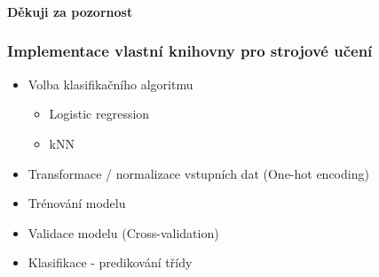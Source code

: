 \documentclass{beamer}
\begin{document}
\begin{frame}
    \frametitle{}
    \centering \textbf{Děkuji za pozornost}
\end{frame}


\begin{frame}
\frametitle{Implementace vlastní knihovny pro strojové učení}


\begin{itemize}
\item Volba klasifikačního algoritmu
    \begin{itemize}
        \item Logistic regression
        \item kNN
    \end{itemize}
\item Transformace / normalizace vstupních dat (One-hot encoding)
\item Trénování modelu
\item Validace modelu (Cross-validation)
\item Klasifikace - predikování třídy
\end{itemize}

\end{frame}
\end{document}
